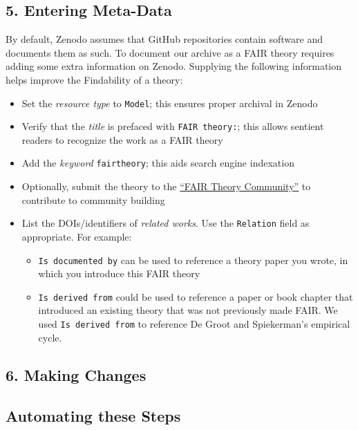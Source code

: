 \documentclass[
  man,floatsintext]{apa6}
\providecommand{\tightlist}{%
  \setlength{\itemsep}{0pt}\setlength{\parskip}{0pt}}
\begin{document}
\subsection{5. Entering Meta-Data}\label{entering-meta-data}

By default, Zenodo assumes that GitHub repositories contain software and documents them as such.
To document our archive as a FAIR theory requires adding some extra information on Zenodo.
Supplying the following information helps improve the Findability of a theory:

\begin{itemize}
\tightlist
\item
  Set the \emph{resource type} to \texttt{Model}; this ensures proper archival in Zenodo
\item
  Verify that the \emph{title} is prefaced with \texttt{FAIR\ theory:}; this allows sentient readers to recognize the work as a FAIR theory
\item
  Add the \emph{keyword} \texttt{fairtheory}; this aids search engine indexation
\item
  Optionally, submit the theory to the \href{https://zenodo.org/communities/fairtheory}{``FAIR Theory Community''} to contribute to community building
\item
  List the DOIs/identifiers of \emph{related works}. Use the \texttt{Relation} field as appropriate. For example:

  \begin{itemize}
  \tightlist
  \item
    \texttt{Is\ documented\ by} can be used to reference a theory paper you wrote, in which you introduce this FAIR theory
  \item
    \texttt{Is\ derived\ from} could be used to reference a paper or book chapter that introduced an existing theory that was not previously made FAIR. We used \texttt{Is\ derived\ from} to reference De Groot and Spiekerman's empirical cycle.
  \end{itemize}
\end{itemize}

\subsection{6. Making Changes}\label{making-changes}

\subsection{Automating these Steps}\label{automating-these-steps}
\end{document}
